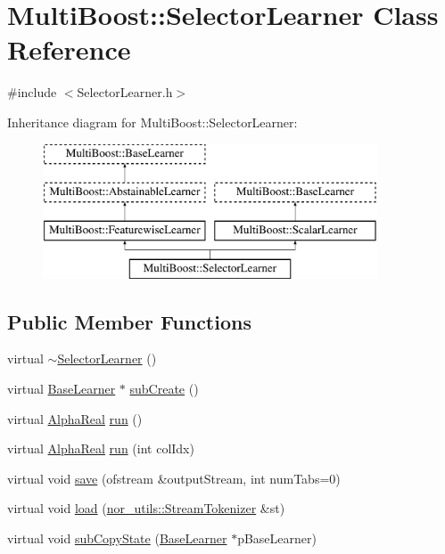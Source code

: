\hypertarget{classMultiBoost_1_1SelectorLearner}{
\section{MultiBoost::SelectorLearner Class Reference}
\label{classMultiBoost_1_1SelectorLearner}
}


{\ttfamily \#include $<$SelectorLearner.h$>$}

Inheritance diagram for MultiBoost::SelectorLearner:\begin{figure}[H]
\begin{center}
\leavevmode
\includegraphics[height=4.000000cm]{classMultiBoost_1_1SelectorLearner}
\end{center}
\end{figure}
\subsection*{Public Member Functions}
\begin{DoxyCompactItemize}
\item 
virtual \hyperlink{classMultiBoost_1_1SelectorLearner_a59a1d1361ebdc31ad0b45195f7beb51e}{$\sim$SelectorLearner} ()
\item 
virtual \hyperlink{classMultiBoost_1_1BaseLearner}{BaseLearner} $\ast$ \hyperlink{classMultiBoost_1_1SelectorLearner_a726c67bf94e15eed8de4b55ee587d5e8}{subCreate} ()
\item 
virtual \hyperlink{Defaults_8h_a80184c4fd10ab70a1a17c5f97dcd1563}{AlphaReal} \hyperlink{classMultiBoost_1_1SelectorLearner_aa6cb50a286800554328ba1edbeadc695}{run} ()
\item 
virtual \hyperlink{Defaults_8h_a80184c4fd10ab70a1a17c5f97dcd1563}{AlphaReal} \hyperlink{classMultiBoost_1_1SelectorLearner_a4a1fdd54afebce2b2917eaa638e21ca2}{run} (int colIdx)
\item 
virtual void \hyperlink{classMultiBoost_1_1SelectorLearner_a1d51fa000c5b04e5ed52dcb8f2981e5a}{save} (ofstream \&outputStream, int numTabs=0)
\item 
virtual void \hyperlink{classMultiBoost_1_1SelectorLearner_a6a5b322170c0d52c90219a87815c8d97}{load} (\hyperlink{classnor__utils_1_1StreamTokenizer}{nor\_\-utils::StreamTokenizer} \&st)
\item 
virtual void \hyperlink{classMultiBoost_1_1SelectorLearner_aac96f1fddd89c6382240fc7d0ddae478}{subCopyState} (\hyperlink{classMultiBoost_1_1BaseLearner}{BaseLearner} $\ast$pBaseLearner)
\end{DoxyCompactItemize}
